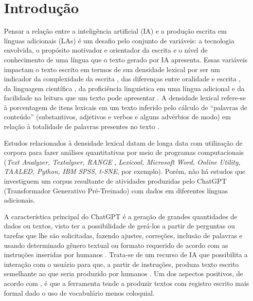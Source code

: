 \documentclass[portuguese]{textolivre}
\begin{document}
\section{Introdução}\label{sec-intro}
Pensar a relação entre a inteligência artificial (IA) e a produção escrita em línguas adicionais (LAs) é um desafio pelo conjunto de variáveis: a tecnologia envolvida, o propósito motivador e orientador da escrita e o nível de conhecimento de uma língua que o texto gerado por IA apresenta. Essas variáveis impactam o texto escrito em termos de sua densidade lexical por ser um indicador da complexidade da escrita \cite{halliday_spoken_1985,halliday_spoken_1987,halliday_part_1989,halliday_grammatical_1993,colombi_academic_2000,martins_densidade_2017}, das diferenças entre oralidade e escrita \cite{halliday_spoken_1985,halliday_spoken_2005,johansson_lexical_2008,gonzalez_fernandez_big_2018}, da linguagem científica \cite{halliday_grammatical_1993,moohebat_identifying_2015,riffo_descripcion_2019,nasseri_lexical_2021}, da proficiência linguística em uma língua adicional \cite{kondal_effects_2015,nalesso_desarrollo_2018,schnur_lexical_2021} e da facilidade na leitura que um texto pode apresentar \cite{kembaren_exploring_2022}. A densidade lexical refere-se à porcentagem de itens lexicais em um texto inferido pelo cálculo de “palavras de conteúdo” (substantivos, adjetivos e verbos e alguns advérbios de modo) em relação à totalidade de palavras presentes no texto \cite{ure_lexical_1971}.

Estudos relacionados à densidade lexical datam de longa data \cite{ure_lexical_1971,halliday_spoken_1985,johansson_lexical_2008,read_assessing_2010} com utilização de corpora para fazer análises quantitativas por meio de programas computacionais (\textit{Text Analyzer, Textalyser, RANGE} \cite{nation_learning_2013}, \textit{Lexicool, Microsoft Word, Online Utility, TAALED, Python, IBM SPSS, t-SNE}, por exemplo). Porém, não há estudos que investiguem um corpus resultante de atividades produzidas pelo ChatGPT (Transformador Generativo Pré-Treinado) com dados em diferentes línguas adicionais.

A característica principal do ChatGPT é a geração de grandes quantidades de dados ou textos, visto ter a possibilidade de gerá-los a partir de perguntas ou tarefas que lhe são solicitadas, fazendo ajustes, correções, inclusão de palavras e usando determinado gênero textual ou formato requerido de acordo com as instruções inseridas por humanos \cite{kumar_analysis_2023,kasneci_chatgpt_2023}. Trata-se de um recurso de IA que possibilita a interação com o usuário para que, a partir de instruções, produza texto escrito semelhante ao que seria produzido por humanos \cite{perkins_academic_2023,king_conversation_2023,rospigliosi_artificial_2023,anderson_ai_2023}. Um dos aspectos positivos, de acordo com \textcite{mitrovic_chatgpt_2023,ramos_inteligencia_2023}, é que a ferramenta tende a produzir textos com registro escrito mais formal dado o uso de vocabulário menos coloquial.
\end{document}
